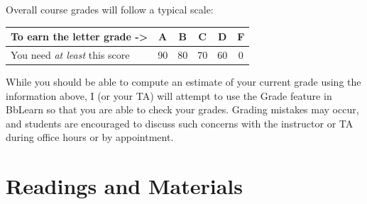 \documentclass[
  letterpaper,
  DIV=11,
  numbers=noendperiod]{scrreprt}
\begin{document}
Overall course grades will follow a typical scale:

\begin{longtable}[]{@{}lccccc@{}}
\toprule()
To earn the letter grade -\textgreater{} & A & B & C & D & F \\
\midrule()
\endhead
You need \emph{at least} this score & 90 & 80 & 70 & 60 & 0 \\
\bottomrule()
\end{longtable}

While you should be able to compute an estimate of your current grade
using the information above, I (or your TA) will attempt to use the
Grade feature in BbLearn so that you are able to check your grades.
Grading mistakes may occur, and students are encouraged to discuss such
concerns with the instructor or TA during office hours or by
appointment.

\hypertarget{sec-readings}{%
\section{Readings and Materials}\label{sec-readings}}
\end{document}
